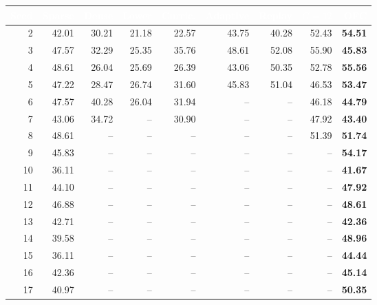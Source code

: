 \begin{tabular}{rrrrrrrr>{\columncolor{ofccolor!12}}r}
\toprule
\rowcolor{headcolor}\textcolor{white}{Seed} & \textcolor{white}{Sparse} & \textcolor{white}{Dense} & \textcolor{white}{Lower} & \textcolor{white}{Curric.} & \textcolor{white}{Adaptive} & \textcolor{white}{Replay} & \textcolor{white}{$G=12$} & \textcolor{white}{OFC} \\
\midrule
2 & 42.01 & 30.21 & 21.18 & 22.57 & 43.75 & 40.28 & 52.43 & \textbf{54.51} \\
3 & 47.57 & 32.29 & 25.35 & 35.76 & 48.61 & 52.08 & 55.90 & \textbf{45.83} \\
4 & 48.61 & 26.04 & 25.69 & 26.39 & 43.06 & 50.35 & 52.78 & \textbf{55.56} \\
5 & 47.22 & 28.47 & 26.74 & 31.60 & 45.83 & 51.04 & 46.53 & \textbf{53.47} \\
6 & 47.57 & 40.28 & 26.04 & 31.94 & -- & -- & 46.18 & \textbf{44.79} \\
7 & 43.06 & 34.72 & -- & 30.90 & -- & -- & 47.92 & \textbf{43.40} \\
8 & 48.61 & -- & -- & -- & -- & -- & 51.39 & \textbf{51.74} \\
9 & 45.83 & -- & -- & -- & -- & -- & -- & \textbf{54.17} \\
10 & 36.11 & -- & -- & -- & -- & -- & -- & \textbf{41.67} \\
11 & 44.10 & -- & -- & -- & -- & -- & -- & \textbf{47.92} \\
12 & 46.88 & -- & -- & -- & -- & -- & -- & \textbf{48.61} \\
13 & 42.71 & -- & -- & -- & -- & -- & -- & \textbf{42.36} \\
14 & 39.58 & -- & -- & -- & -- & -- & -- & \textbf{48.96} \\
15 & 36.11 & -- & -- & -- & -- & -- & -- & \textbf{44.44} \\
16 & 42.36 & -- & -- & -- & -- & -- & -- & \textbf{45.14} \\
17 & 40.97 & -- & -- & -- & -- & -- & -- & \textbf{50.35} \\
\bottomrule
\end{tabular}
